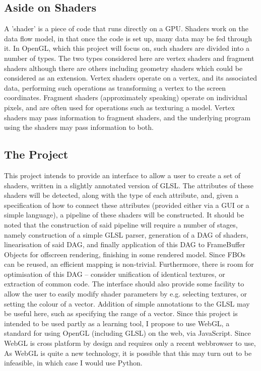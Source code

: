 \subsection{Aside on Shaders}
A 'shader' is a piece of code that runs directly on a GPU. Shaders work on the data flow model, in
that once the code is set up, many data may be fed through it. In OpenGL, which this project will
focus on, such shaders are divided into a number of types. The two types considered here are vertex
shaders and fragment shaders although there are others including geometry shaders which could be
considered as an extension. Vertex shaders operate on a vertex, and its associated data, performing
such operations as transforming a vertex to the screen coordinates. Fragment shaders
(approximately speaking) operate on individual pixels, and are often used for operations such as
texturing a model. Vertex shaders may pass information to fragment shaders, and the underlying
program using the shaders may pass information to both.

\subsection{The Project}
This project intends to provide an interface to allow a user to create a set of shaders, written in a
slightly annotated version of GLSL. The attributes of these shaders will be detected, along with the
type of each attribute, and, given a specification of how to connect these attributes (provided either
via a GUI or a simple language), a pipeline of these shaders will be constructed.
It should be noted that the construction of said pipeline will require a number of stages, namely
construction of a simple GLSL parser, generation of a DAG of shaders, linearisation of said DAG,
and finally application of this DAG to FrameBuffer Objects for offscreen rendering, finishing in
some rendered model. Since FBOs can be reused, an efficient mapping is non-trivial. Furthermore,
there is room for optimisation of this DAG – consider unification of identical textures, or extraction
of common code.
The interface should also provide some facility to allow the user to easily modify shader parameters
by e.g. selecting textures, or setting the colour of a vector. Addition of simple annotations to the
GLSL may be useful here, such as specifying the range of a vector.
Since this project is intended to be used partly as a learning tool, I propose to use WebGL, a
standard for using OpenGL (including GLSL) on the web, via JavaScript. Since WebGL is cross
platform by design and requires only a recent webbrowser to use, As WebGL is quite a new
technology, it is possible that this may turn out to be infeasible, in which case I would use Python.

